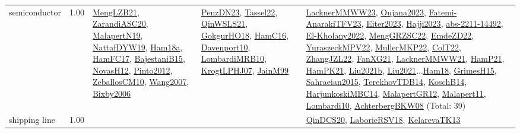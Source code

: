 {\begin{longtable}{p{3cm}r>{\raggedright\arraybackslash}p{6cm}>{\raggedright\arraybackslash}p{6cm}>{\raggedright\arraybackslash}p{8cm}}
\index{semiconductor}\index{ApplicationAreas!semiconductor}semiconductor &  1.00 & \hyperref[detail:MengLZB21]{MengLZB21}, \hyperref[detail:ZarandiASC20]{ZarandiASC20}, \hyperref[detail:MalapertN19]{MalapertN19}, \hyperref[detail:NattafDYW19]{NattafDYW19}, \hyperref[detail:Ham18a]{Ham18a}, \hyperref[detail:HamFC17]{HamFC17}, \hyperref[detail:BajestaniB15]{BajestaniB15}, \hyperref[detail:NovasH12]{NovasH12}, \hyperref[detail:Pinto2012]{Pinto2012}, \hyperref[detail:ZeballosCM10]{ZeballosCM10}, \hyperref[detail:Wang2007]{Wang2007}, \hyperref[detail:Bixby2006]{Bixby2006} & \hyperref[detail:PenzDN23]{PenzDN23}, \hyperref[detail:Tassel22]{Tassel22}, \hyperref[detail:QinWSLS21]{QinWSLS21}, \hyperref[detail:GokgurHO18]{GokgurHO18}, \hyperref[detail:HamC16]{HamC16}, \hyperref[detail:Davenport10]{Davenport10}, \hyperref[detail:LombardiMRB10]{LombardiMRB10}, \hyperref[detail:KrogtLPHJ07]{KrogtLPHJ07}, \hyperref[detail:JainM99]{JainM99} & \hyperref[detail:LacknerMMWW23]{LacknerMMWW23}, \hyperref[detail:Oujana2023]{Oujana2023}, \hyperref[detail:Fatemi-AnarakiTFV23]{Fatemi-AnarakiTFV23}, \hyperref[detail:Eiter2023]{Eiter2023}, \hyperref[detail:Hajji2023]{Hajji2023}, \hyperref[detail:abs-2211-14492]{abs-2211-14492}, \hyperref[detail:El-Kholany2022]{El-Kholany2022}, \hyperref[detail:MengGRZSC22]{MengGRZSC22}, \hyperref[detail:EmdeZD22]{EmdeZD22}, \hyperref[detail:YuraszeckMPV22]{YuraszeckMPV22}, \hyperref[detail:MullerMKP22]{MullerMKP22}, \hyperref[detail:ColT22]{ColT22}, \hyperref[detail:ZhangJZL22]{ZhangJZL22}, \hyperref[detail:FanXG21]{FanXG21}, \hyperref[detail:LacknerMMWW21]{LacknerMMWW21}, \hyperref[detail:HamP21]{HamP21}, \hyperref[detail:HamPK21]{HamPK21}, \hyperref[detail:Liu2021b]{Liu2021b}, \hyperref[detail:Liu2021]{Liu2021}...\hyperref[detail:Ham18]{Ham18}, \hyperref[detail:GrimesH15]{GrimesH15}, \hyperref[detail:Sahraeian2015]{Sahraeian2015}, \hyperref[detail:TerekhovTDB14]{TerekhovTDB14}, \hyperref[detail:KoschB14]{KoschB14}, \hyperref[detail:HarjunkoskiMBC14]{HarjunkoskiMBC14}, \hyperref[detail:MalapertGR12]{MalapertGR12}, \hyperref[detail:Malapert11]{Malapert11}, \hyperref[detail:Lombardi10]{Lombardi10}, \hyperref[detail:AchterbergBKW08]{AchterbergBKW08} (Total: 39)\\
\index{shipping line}\index{ApplicationAreas!shipping line}shipping line &  1.00 &  &  & \hyperref[detail:QinDCS20]{QinDCS20}, \hyperref[detail:LaborieRSV18]{LaborieRSV18}, \hyperref[detail:KelarevaTK13]{KelarevaTK13}\\

\end{longtable}}
